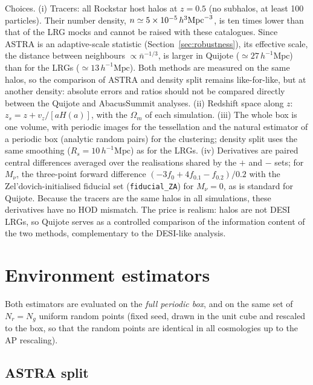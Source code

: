 \documentclass[11pt,twocolumn]{article}
\newcommand{\Mpch}{\,h^{-1}\mathrm{Mpc}}
\begin{document}
Choices. (i) Tracers: all Rockstar host halos at $z=0.5$ (no subhalos, at least 100 particles). Their number density, $n\simeq5\times10^{-5}\,h^3{\rm Mpc}^{-3}$, is ten times lower than that of the LRG mocks and cannot be raised with these catalogues. Since ASTRA is an adaptive-scale statistic (Section~\ref{sec:robustness}), its effective scale, the distance between neighbours $\propto\bar n^{-1/3}$, is larger in Quijote ($\simeq27\Mpch$) than for the LRGs ($\simeq13\Mpch$). Both methods are measured on the same halos, so the comparison of ASTRA and density split remains like-for-like, but at another density: absolute errors and ratios should not be compared directly between the Quijote and AbacusSummit analyses. (ii) Redshift space along $z$: $z_s = z + v_z/[aH(a)]$, with the $\Omega_m$ of each simulation. (iii) The whole box is one volume, with periodic images for the tessellation and the natural estimator of a periodic box (analytic random pairs) for the clustering; density split uses the same smoothing ($R_s=10\Mpch$) as for the LRGs. (iv) Derivatives are paired central differences averaged over the realisations shared by the $+$ and $-$ sets; for $M_\nu$, the three-point forward difference $(-3f_0+4f_{0.1}-f_{0.2})/0.2$ with the Zel'dovich-initialised fiducial set (\texttt{fiducial\_ZA}) for $M_\nu=0$, as is standard for Quijote. Because the tracers are the same halos in all simulations, these derivatives have no HOD mismatch. The price is realism: halos are not DESI LRGs, so Quijote serves as a controlled comparison of the information content of the two methods, complementary to the DESI-like analysis.

\section{Environment estimators}
\label{sec:env}

Both estimators are evaluated on the \emph{full periodic box}, and on the same set of $N_r = N_g$ uniform random points (fixed seed, drawn in the unit cube and rescaled to the box, so that the random points are identical in all cosmologies up to the AP rescaling).

\subsection{ASTRA split}
\end{document}
